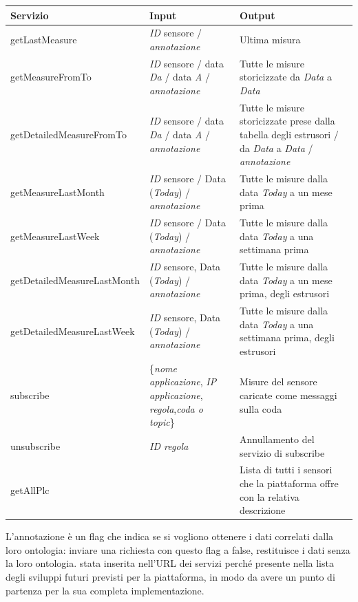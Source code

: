\begin{center}
	\begin{tabular}{ | l | p{5.06cm} | p{5.06cm} |}
		\hline
		\textbf{Servizio} & \textbf{Input} & \textbf{Output} \\ \hline
		getLastMeasure & \textit{ID} sensore / \textit{annotazione} & Ultima misura   \\ \hline
		getMeasureFromTo & \textit{ID} sensore / data \textit{Da} / data \textit{A} / \textit{annotazione} & Tutte le misure storicizzate da \textit{Data} a \textit{Data} \\ \hline
		getDetailedMeasureFromTo & \textit{ID} sensore / data \textit{Da} / data \textit{A} / \textit{annotazione} & Tutte le misure storicizzate prese dalla tabella degli estrusori / da \textit{Data} a \textit{Data} / \textit{annotazione}  \\ \hline
		getMeasureLastMonth & \textit{ID} sensore / Data (\textit{Today}) / \textit{annotazione} & Tutte le misure dalla data \textit{Today} a un mese prima \\ \hline
		getMeasureLastWeek & \textit{ID} sensore / Data (\textit{Today}) / \textit{annotazione} & Tutte le misure dalla data \textit{Today} a una settimana prima \\ \hline
		getDetailedMeasureLastMonth & \textit{ID} sensore, Data (\textit{Today}) / \textit{annotazione} & Tutte le misure dalla data \textit{Today} a un mese prima, degli estrusori \\ \hline
		getDetailedMeasureLastWeek & \textit{ID} sensore, Data (\textit{Today}) / \textit{annotazione} & Tutte le misure dalla data \textit{Today} a una settimana prima, degli estrusori \\ \hline
		subscribe & \{\textit{nome applicazione}, \textit{IP applicazione}, \textit{regola},\textit{coda o topic}\} & Misure del sensore caricate come messaggi sulla coda \\ \hline
		unsubscribe & \textit{ID regola} & Annullamento del servizio di subscribe \\ \hline
		getAllPlc & & Lista di tutti i sensori che la piattaforma offre con la relativa descrizione \\ \hline
	\end{tabular}
\end{center}
L'annotazione è un flag che indica se si vogliono ottenere i dati correlati dalla loro ontologia: inviare una richiesta con questo flag a false, restituisce i dati senza la loro ontologia.  stata inserita nell'URL dei servizi perché presente nella lista degli sviluppi futuri previsti per la piattaforma, in modo da avere un punto di partenza per la sua completa implementazione.
\clearpage
